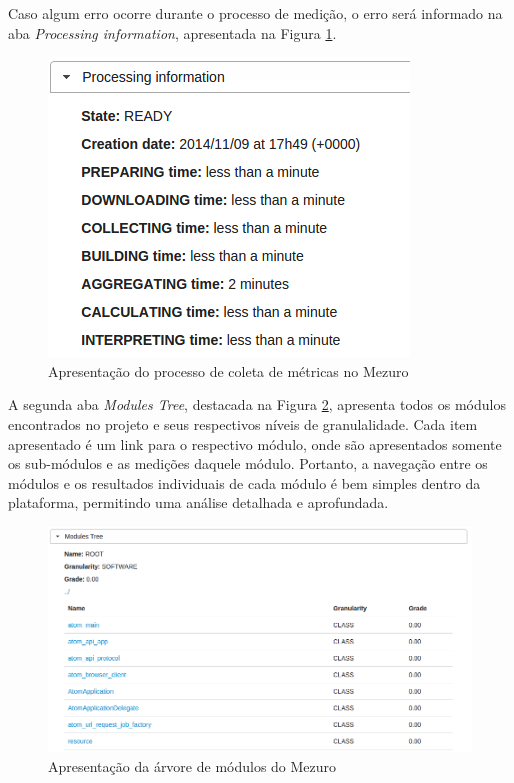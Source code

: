 Caso algum erro ocorre durante o processo de medição, o erro será informado na aba \emph{Processing information}, apresentada na Figura \ref{proc_info}. 

\begin{figure}[H]
	\centering
		\includegraphics[scale=0.5]{figuras/proc_info}
		\caption{Apresentação do processo de coleta de métricas no Mezuro}
		\label{proc_info}
\end{figure}

A segunda aba \emph{Modules Tree}, destacada na Figura \ref{modules_info}, apresenta todos os módulos encontrados no projeto e seus respectivos níveis de granulalidade. Cada item apresentado é um link para o respectivo módulo, onde são apresentados somente os sub-módulos e as medições daquele módulo. Portanto, a navegação entre os módulos e os resultados individuais de cada módulo é bem simples dentro da plataforma, permitindo uma análise detalhada e aprofundada.

\begin{figure}
	\centering
		\includegraphics[scale=0.5]{figuras/modules_info}
		\caption{Apresentação da árvore de módulos do Mezuro}
		\label{modules_info}
\end{figure}

